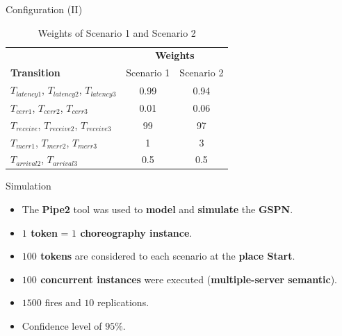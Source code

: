 \documentclass[xcolor=svgnames]{beamer}
\newcommand {\otoprule}{\midrule [\heavyrulewidth]}  %
\begin{document}
  \begin{frame}{ Configuration (II)}
        \begin{table}[!h]
            \centering
            \caption{Weights of Scenario 1 and Scenario 2}
            \label{table:transitionsConfigurations}
            \begin{tabular}{ lcc}
	      \toprule	
        		    &   \multicolumn{2}{c}{ \textbf{Weights} } \\
	      \cmidrule(r){2-3}
              \textbf{Transition}      		&      Scenario 1   &   Scenario 2 		\\
	      \otoprule
               $T_{latency1}$, $T_{latency2}$, $T_{latency3}$ 	& 	0.99       &   0.94	\\
               $T_{cerr1}$, $T_{cerr2}$, $T_{cerr3}$      	&  	0.01 	   &   0.06	\\
               $T_{receive}$, $T_{receive2}$, $T_{receive3}$  &  	99  	   &    97	\\
               $T_{merr1}$, $T_{merr2}$, $T_{merr3}$   &   1 	   &    3	\\
               $T_{arrival2}$, $T_{arrival3}$   &  0.5  &	0.5	\\
              \bottomrule
            \end{tabular}
        \end{table}

  \end{frame}


  \begin{frame}{ Simulation}
   \begin{itemize}
     \item <1-> The \textbf{Pipe2} tool was used to \textbf{model} and \textbf{simulate} the \textbf{GSPN}.
     \item <2-> \textbf{$1$ token} = \textbf{$1$ choreography instance}.
     \item <2-> \textbf{$100$ tokens} are considered to each scenario at the \textbf{place Start}.
     \item <2-> \textbf{$100$ concurrent instances} were executed (\textbf{multiple-server semantic}).
     \item <3-> $1500$ fires and $10$ replications.
     \item <3-> Confidence level of $95\%$.
   \end{itemize}
  \end{frame}
\end{document}
